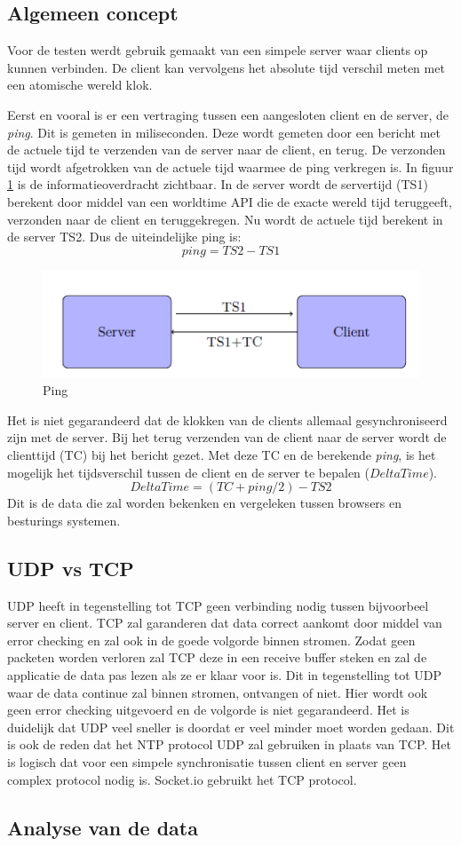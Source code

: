 \subsection{Algemeen concept}
Voor de testen werdt gebruik gemaakt van een simpele server waar clients op kunnen verbinden. De client kan vervolgens het absolute tijd verschil meten met een atomische wereld klok. 

Eerst en vooral is er een vertraging tussen een aangesloten client en de server, de {\it ping}. Dit is gemeten in miliseconden.
Deze wordt gemeten door een bericht met de actuele tijd te verzenden van de server naar de client, en terug. De verzonden tijd wordt afgetrokken van de actuele tijd waarmee de ping verkregen is.
In figuur \ref{diag} is de informatieoverdracht zichtbaar. In de server wordt de servertijd (TS1) berekent door middel van een worldtime API die de exacte wereld tijd teruggeeft, verzonden naar de client en teruggekregen. 
Nu wordt de actuele tijd berekent in de server TS2. Dus de uiteindelijke ping is:
\[ping = TS2 - TS1\]

\begin{figure}
\centering
\includegraphics[scale=0.8]{img/img.png}
\caption{Ping} \label{diag}
\end{figure}


Het is niet gegarandeerd dat de klokken van de clients allemaal gesynchroniseerd zijn met de server.
Bij het terug verzenden van de client naar de server wordt de clienttijd (TC) bij het bericht gezet. Met deze TC en de berekende {\it ping}, is het mogelijk het tijdsverschil tussen de client en de server te bepalen ($DeltaTime$).
\[DeltaTime = (TC+ping/2) - TS2\]
Dit is de data die zal worden bekenken en vergeleken tussen browsers en besturings systemen.

\subsection{UDP vs TCP}

UDP heeft in tegenstelling tot TCP geen verbinding nodig tussen bijvoorbeel server en client. TCP zal garanderen dat data correct aankomt door middel van error checking en zal ook in de goede volgorde binnen stromen. Zodat geen packeten worden verloren zal TCP deze in een receive buffer steken en zal de applicatie de data pas lezen als ze er klaar voor is. Dit in tegenstelling tot UDP waar de data continue zal binnen stromen, ontvangen of niet. Hier wordt ook geen error checking uitgevoerd en de volgorde is niet gegarandeerd. Het is duidelijk dat UDP veel sneller is doordat er veel minder moet worden gedaan. Dit is ook de reden dat het NTP protocol UDP zal gebruiken in plaats van TCP. Het is logisch dat voor een simpele synchronisatie tussen client en server geen complex protocol nodig is.
Socket.io gebruikt het TCP protocol. 



\subsection{Analyse van de data}
